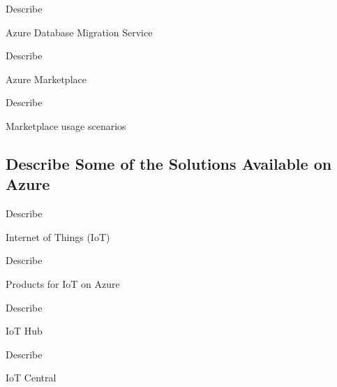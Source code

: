 \documentclass{scrartcl}
\newenvironment{flashcard}[2][]{%
    #1
    \vfill
    \centerline{\Large{#2}}
    \vfill
    \newpage
}
{\newpage}
\newcommand{\subsectioncard}[1]{
    \vspace*{\stretch{1}}
    \subsection{#1}
    \vspace*{\stretch{1}}
    \pagebreak
}
\begin{document}
    \begin{flashcard}[Describe]{Azure Database Migration Service}

    \end{flashcard}

    \begin{flashcard}[Describe]{Azure Marketplace}

    \end{flashcard}

    \begin{flashcard}[Describe]{Marketplace usage scenarios}

    \end{flashcard}

    \subsectioncard{Describe Some of the Solutions Available on Azure}

    \begin{flashcard}[Describe]{Internet of Things (IoT)}

    \end{flashcard}

    \begin{flashcard}[Describe]{Products for IoT on Azure}

    \end{flashcard}

    \begin{flashcard}[Describe]{IoT Hub}

    \end{flashcard}

    \begin{flashcard}[Describe]{IoT Central}

    \end{flashcard}
\end{document}
